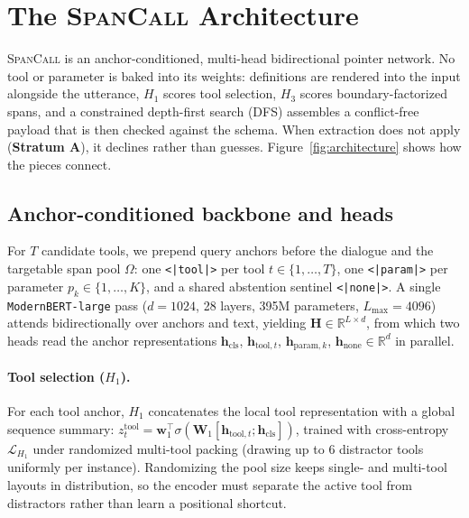 \section{The \textsc{SpanCall} Architecture}
\label{sec:method}

\textsc{SpanCall} is an anchor-conditioned, multi-head bidirectional pointer network. No tool or parameter is baked into its weights: definitions are rendered into the input alongside the utterance, $H_1$ scores tool selection, $H_3$ scores boundary-factorized spans, and a constrained depth-first search (DFS) assembles a conflict-free payload that is then checked against the schema. When extraction does not apply (\textbf{Stratum A}), it declines rather than guesses. Figure~\ref{fig:architecture} shows how the pieces connect.

\subsection{Anchor-conditioned backbone and heads}
\label{sec:method:model}

For $T$ candidate tools, we prepend query anchors before the dialogue and the targetable span pool $\Omega$: one \texttt{<|tool|>} per tool $t \in \{1,\dots,T\}$, one \texttt{<|param|>} per parameter $p_k \in \{1,\dots,K\}$, and a shared abstention sentinel \texttt{<|none|>}. A single \texttt{ModernBERT-large} pass ($d{=}1024$, 28 layers, 395M parameters, $L_{\max}{=}4096$) attends bidirectionally over anchors and text, yielding $\mathbf{H} \in \mathbb{R}^{L \times d}$, from which two heads read the anchor representations $\mathbf{h}_{\text{cls}}$, $\mathbf{h}_{\text{tool}, t}$, $\mathbf{h}_{\text{param}, k}$, $\mathbf{h}_{\text{none}} \in \mathbb{R}^d$ in parallel.

\paragraph{Tool selection ($H_1$).}
For each tool anchor, $H_1$ concatenates the local tool representation with a global sequence summary: $z_t^{\text{tool}} = \mathbf{w}_1^\top \sigma(\mathbf{W}_1 [\mathbf{h}_{\text{tool}, t}; \mathbf{h}_{\text{cls}}])$, trained with cross-entropy $\mathcal{L}_{H_1}$ under randomized multi-tool packing (drawing up to 6 distractor tools uniformly per instance). Randomizing the pool size keeps single- and multi-tool layouts in distribution, so the encoder must separate the active tool from distractors rather than learn a positional shortcut.

